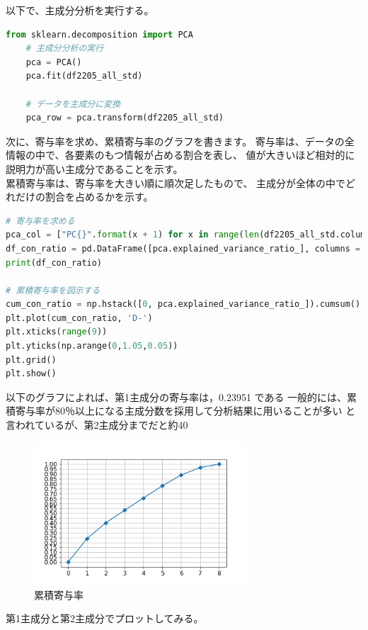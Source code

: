 \documentclass[submit,noauthor]{ono}
\begin{document}
以下で、主成分分析を実行する。

\begin{lstlisting}[language=Python,breaklines]
	from sklearn.decomposition import PCA
	# 主成分分析の実行
	pca = PCA()
	pca.fit(df2205_all_std)

	# データを主成分に変換
	pca_row = pca.transform(df2205_all_std)
\end{lstlisting}

次に、寄与率を求め、累積寄与率のグラフを書きます。
寄与率は、データの全情報の中で、各要素のもつ情報が占める割合を表し、
値が大きいほど相対的に説明力が高い主成分であることを示す。\\
累積寄与率は、寄与率を大きい順に順次足したもので、
主成分が全体の中でどれだけの割合を占めるかを示す。

\begin{lstlisting}[language=Python,breaklines]
# 寄与率を求める
pca_col = ["PC{}".format(x + 1) for x in range(len(df2205_all_std.columns))]
df_con_ratio = pd.DataFrame([pca.explained_variance_ratio_], columns = pca_col)
print(df_con_ratio)

# 累積寄与率を図示する
cum_con_ratio = np.hstack([0, pca.explained_variance_ratio_]).cumsum()
plt.plot(cum_con_ratio, 'D-')
plt.xticks(range(9))
plt.yticks(np.arange(0,1.05,0.05))
plt.grid()
plt.show()
\end{lstlisting}

以下のグラフによれば、第1主成分の寄与率は，0.23951 である
一般的には、累積寄与率が80％以上になる主成分数を採用して分析結果に用いることが多い
と言われているが、第2主成分までだと約40%

\begin{figure}[h]
	\includegraphics[width=8cm]{./picture/cumulative_contribution_ratio.png}
	\caption{累積寄与率}
	\label{fig:umulative_contribution_ratio}
\end{figure}

第1主成分と第2主成分でプロットしてみる。
\end{document}
